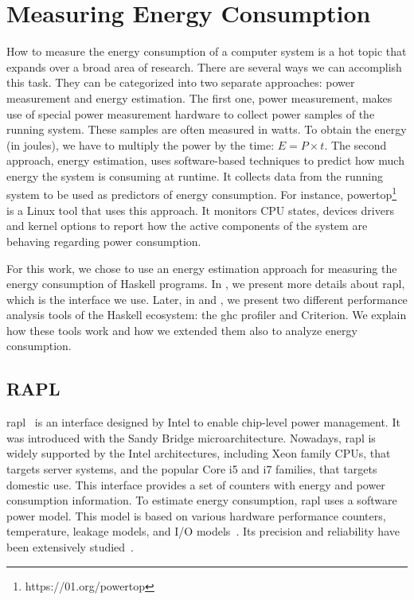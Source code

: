 \chapter{Measuring Energy Consumption}\label{chp:tools}
How to measure the energy consumption of a computer system is a hot topic that expands over a broad area of research. There are several ways we can accomplish this task. They can be categorized into two separate approaches: power measurement and energy estimation. The first one, power measurement, makes use of special power measurement hardware to collect power samples of the running system. These samples are often measured in watts. To obtain the energy (in joules), we have to multiply the power by the time: $E = P \times t$.
The second approach, energy estimation, uses software-based techniques to predict how much energy the system is consuming at runtime. It collects data from the running system to be used as predictors of energy consumption. For instance, powertop\footnote{https://01.org/powertop} is a Linux tool that uses this approach. It monitors CPU states, devices drivers and kernel options to report how the active components of the system are behaving regarding power consumption.

For this work, we chose to use an energy estimation approach for measuring the energy consumption of Haskell programs. In , we present more details about \acs{rapl}, which is the interface we use. Later, in  and , we present two different performance analysis tools of the Haskell ecosystem: the \acs{ghc} profiler and Criterion. We explain how these tools work and how we extended them also to analyze energy consumption.

\section{RAPL}\label{sec:rapl}
\ac{rapl}~\cite{david:2010} is an interface designed by Intel to enable chip-level power management. It was introduced with the Sandy Bridge microarchitecture. Nowadays, \acs{rapl} is widely supported by the Intel architectures, including Xeon family CPUs, that targets server systems, and the popular Core i5 and i7 families, that targets domestic use. This interface provides a set of counters with energy and power consumption information. To estimate energy consumption, \acs{rapl} uses a software power model. This model is based on various hardware performance counters, temperature, leakage models, and I/O models~\cite{weaver:2012}. Its precision and reliability have been extensively studied~\cite{rotem:2012,hahnel:2012}.

